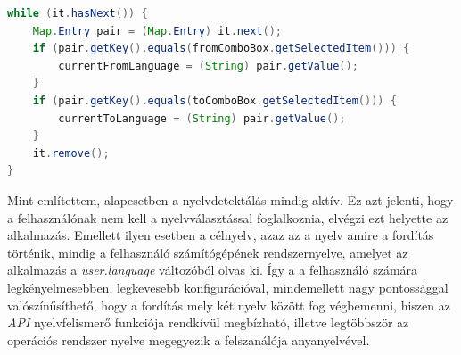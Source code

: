 \begin{lstlisting}[caption=Aktuális nyelvek beállítása, language=java, label={lst:kulcs_érték}]
while (it.hasNext()) {
    Map.Entry pair = (Map.Entry) it.next();
    if (pair.getKey().equals(fromComboBox.getSelectedItem())) {
        currentFromLanguage = (String) pair.getValue();
    }
    if (pair.getKey().equals(toComboBox.getSelectedItem())) {
        currentToLanguage = (String) pair.getValue();
    }
    it.remove();
}
\end{lstlisting}

Mint említettem, alapesetben a nyelvdetektálás mindig aktív. Ez azt jelenti, hogy a felhasználónak nem kell a nyelvválasztással foglalkoznia, elvégzi ezt helyette az alkalmazás. Emellett ilyen esetben a célnyelv, azaz az a nyelv amire a fordítás történik, mindig a felhasználó számítógépének rendszernyelve, amelyet az alkalmazás a \textit{user.language} változóból olvas ki. Így a a felhasználó számára legkényelmesebben, legkevesebb konfigurációval, mindemellett nagy pontossággal valószínűsíthető, hogy a fordítás mely két nyelv között fog végbemenni, hiszen az \textit{API} nyelvfelismerő funkciója rendkívül megbízható, illetve legtöbbször az operációs rendszer nyelve megegyezik a felszanálója anyanyelvével.
